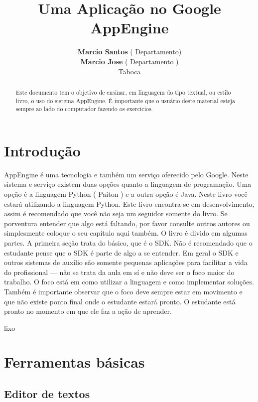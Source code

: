\documentclass[a4paper]{article}
\title{Uma Aplicação no Google AppEngine}
\author{\textbf{Marcio Santos} ( Departamento)\\
        \textbf{Marcio Jose} ( Departamento )\\
        Taboca}
\begin{document}
\maketitle
\begin{abstract}
Este documento tem o objetivo de ensinar, em linguagem do tipo textual, ou estilo livro, o uso do sistema AppEngine. É importante que o usuário deste material esteja sempre ao lado do computador fazendo os exercícios. 
\end{abstract}
\tableofcontents



\section{Introdu\c{c}\~{a}o}

AppEngine é uma tecnologia e também um serviço oferecido pelo Google. Neste sistema e serviço existem duas opções quanto a linguagem de programação. Uma opção é a linguagem Python ( Paiton ) e a outra opção é Java. Neste livro você estará utilizando a linguagem Python. Este livro encontra-se em desenvolvimento, assim é recomendado que você não seja um seguidor somente do livro. Se porventura entender que algo está faltando, por favor consulte outros autores ou simplesmente coloque o seu capítulo aqui também. O livro é divido em algumas partes. A primeira seção trata do básico, que é o SDK. Não é recomendado que o estudante pense que o SDK é parte de algo a se entender. Em geral o SDK e outros sistemas de auxílio são somente pequenas aplicações para facilitar a vida do profissional --- não se trata da aula em sí e não deve ser o foco maior do trabalho. O foco está em como utilizar a linguagem e como implementar soluções. Também é importante observar que o foco deve sempre estar em movimento e que não existe ponto final onde o estudante estará  pronto. O estudante está pronto no momento em  que ele faz a ação de aprender.




lixo



\section{Ferramentas básicas}

\subsection{Editor de textos}
\end{document}
